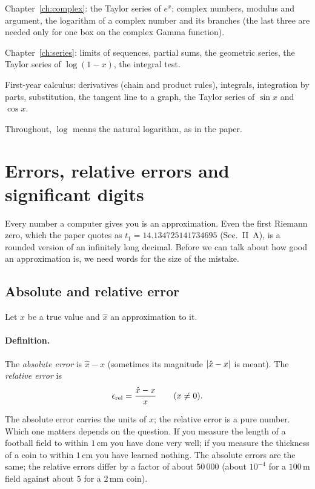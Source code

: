 \begin{prerequisites}
\item Chapter~\ref{ch:complex}: the Taylor series of $e^x$; complex numbers, modulus and argument, the logarithm of a complex number and its branches (the last three are needed only for one box on the complex Gamma function).
\item Chapter~\ref{ch:series}: limits of sequences, partial sums, the geometric series, the Taylor series of $\log(1-x)$, the integral test.
\item First-year calculus: derivatives (chain and product rules), integrals, integration by parts, substitution, the tangent line to a graph, the Taylor series of $\sin x$ and $\cos x$.
\item Throughout, $\log$ means the natural logarithm, as in the paper.
\end{prerequisites}

\section{Errors, relative errors and significant digits}\label{sec:asymptotics-errors}

Every number a computer gives you is an approximation. Even the first Riemann zero, which the paper quotes as $t_1=14.134725141734695$ (Sec.~II~A), is a rounded version of an infinitely long decimal. Before we can talk about how good an approximation is, we need words for the size of the mistake.

\subsection{Absolute and relative error}

Let $x$ be a true value and $\hat x$ an approximation to it.

\paragraph{Definition.} The \emph{absolute error} is $\hat x - x$ (sometimes its magnitude $\left\lvert \hat x-x\right\rvert$ is meant). The \emph{relative error} is
\begin{equation}
\epsilon_{\rm rel}=\frac{\hat x - x}{x}\qquad (x\neq 0).
\label{eq:asymptotics-relerr}
\end{equation}

The absolute error carries the units of $x$; the relative error is a pure number. Which one matters depends on the question. If you measure the length of a football field to within $1\,$cm you have done very well; if you measure the thickness of a coin to within $1\,$cm you have learned nothing. The absolute errors are the same; the relative errors differ by a factor of about $50\,000$ (about $10^{-4}$ for a $100\,$m field against about $5$ for a $2\,$mm coin).

